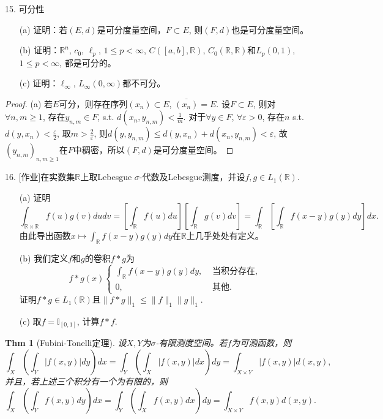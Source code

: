 \documentclass[a4paper,8pt]{ctexart}\textwidth 140mm \textheight 216mm
\newtheorem{Thm}{Thm}[section]
\newcommand{\e}{\varepsilon}
\newcommand{\8}{\infty}
\begin{document}
15. 可分性 
\begin{itemize}
	\item[(a)] 证明：若$(E,d)$是可分度量空间，$F\subset E$, 则$(F,d)$也是可分度量空间。
	\item[(b)] 证明：$\mathbb{R}^n$, $c_0$, $\ell_p$, $1\leq p<\infty$, $C([a,b],\mathbb{R})$, $C_0(\mathbb{R},\mathbb{R})$和$L_p(0,1)$, $1\leq p<\infty$, 都是可分的。
	\item[(c)] 证明：$\ell_\infty$, $L_{\infty}(0,\infty)$都不可分。
\end{itemize}
\begin{proof}
	(a)  若$E$可分，则存在序列$(x_n)\subset E$, $\overline{(x_n)}=E$. 设$F\subset E$, 则对$\forall n,m\geq 1$, 存在$y_{n,m}\in F$, s.t. $d(x_n,y_{n,m})<\frac{1}{m}$. 对于$\forall y\in F$, $\forall \e>0$, 存在$n$ s.t. $d(y,x_n)<\frac{\e}{2}$, 取$m>\frac{2}{\e}$, 则$d(y,y_{n,m})\leq d(y,x_n)+d(x_n,y_{n,m})<\e$, 故$(y_{n,m})_{n,m\geq 1}$在$F$中稠密，所以$(F,d)$是可分度量空间。 
\end{proof}
16. [作业]在实数集$\mathbb{R}$上取Lebesgue $\sigma$-代数及Lebesgue测度，并设$f,g\in L_1(\mathbb{R})$.
\begin{enumerate}
	\item[(a)] 证明
	\[\int_{\mathbb{R}\times\mathbb{R}}f(u)g(v)dudv=[\int_\mathbb{R}f(u)du][\int_{\mathbb{R}}g(v)dv]=\int_\mathbb{R}[\int_\mathbb{R}f(x-y)g(y)dy]dx.\]
	由此导出函数$x\mapsto \int_\mathbb{R}f(x-y)g(y)dy$在$\mathbb{R}$上几乎处处有定义。
	\item[(b)] 我们定义$f$和$g$的卷积$f*g$为
	\[f*g(x)\begin{cases}
	\int_\mathbb{R} f(x-y)g(y)dy, &\mbox{ 当积分存在, }\\
	0, &\mbox{ 其他. }
	\end{cases}\]
	证明$f*g\in L_1(\mathbb{R})$且$\|f*g\|_1\leq \|f\|_1\|g\|_1$.
	\item[(c)] 取$f=\mathbb{I}_{[0,1]}$, 计算$f*f$.
\end{enumerate}
\begin{Thm}[Fubini-Tonelli定理] 
	设$X,Y$为$\sigma$-有限测度空间。若$f$为可测函数，则
	\begin{equation}
	\int_X(\int_Y |f(x,y)|dy)dx=\int_Y(\int_X |f(x,y)|dx)dy=\int_{X\times Y}|f(x,y)|d(x,y),
	\end{equation}
	并且，若上述三个积分有一个为有限的，则
	\begin{equation}
	\int_X(\int_Y f(x,y)dy)dx=\int_Y(\int_X f(x,y)dx)dy=\int_{X\times Y}f(x,y)d(x,y).
	\end{equation}
\end{Thm}
\end{document}
